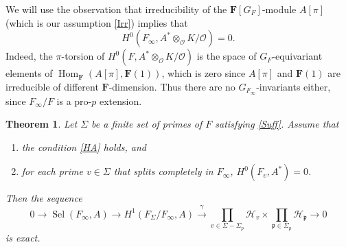\documentclass[12 pt]{amsart}
\theoremstyle{plain}
\newtheorem{thm}{Theorem}[section]
\theoremstyle{definition}
\numberwithin{equation}{section}
\numberwithin{table}{section}
\begin{document}
\indent We will use the observation that irreducibility of the $\mathbf{F}[G_F]$-module $A[\pi]$ (which is our assumption \cref{Irr}) implies that
\begin{equation*}
H^0(F_\infty,A^*\otimes_\mathscr{O}K/\mathscr{O})=0\text{.}
\end{equation*}
Indeed, the $\pi$-torsion of $H^0(F,A^*\otimes_\mathscr{O}K/\mathscr{O})$ is the space of $G_F$-equivariant elements of $\operatorname{Hom}_\mathbf{F}(A[\pi],\mathbf{F}(1))$, which is zero since $A[\pi]$ and $\mathbf{F}(1)$ are irreducible of different $\mathbf{F}$-dimension. Thus there are no $G_{F_\infty}$-invariants either, since $F_\infty/F$ is a pro-$p$ extension.
\begin{thm}
\label{sel-surj}
Let $\Sigma$ be a finite set of primes of $F$ satisfying \emph{\cref{Suff}}. Assume that
\begin{enumerate}
\item the condition \emph{\cref{HA}} holds, and
\item for each prime $v\in\Sigma$ that splits completely in $F_\infty$, $H^0(F_v,A^*)=0$.
\end{enumerate}
Then the sequence
\begin{equation*}
0\rightarrow\operatorname{Sel}(F_\infty,A)\rightarrow H^1(F_\Sigma/F_\infty,A)\xrightarrow{\gamma}\prod_{v\in\Sigma-\Sigma_p}\mathcal{H}_v\times\prod_{\mathfrak{p}\in\Sigma_p}
\mathcal{H}_\mathfrak{p}\rightarrow 0
\end{equation*}
is exact.
\end{thm}
\end{document}
